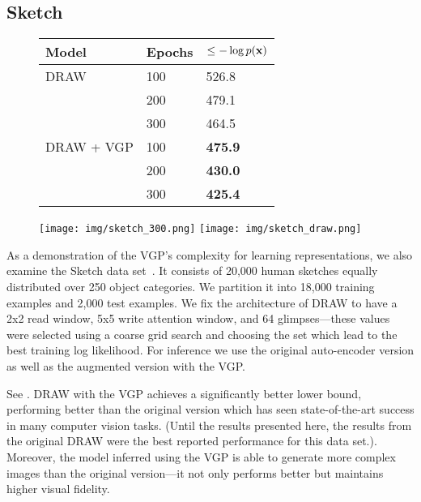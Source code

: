 \subsection{Sketch}
\begin{figure}[t]
\begin{minipage}{\textwidth}
\begin{minipage}[!t]{.45\textwidth}
\centering
\begin{tabular}{lll}
\toprule
Model & Epochs & $\le -\log p(\boldsymbol{\mathbf{x}})$
\\
\midrule
\gls{DRAW} & 100 & 526.8\\
           & 200 & 479.1\\
           & 300 & 464.5\\
\gls{DRAW} + \gls{VGP} & 100 & \textbf{475.9}\\
                       & 200 & \textbf{430.0}\\
                       & 300 & \textbf{425.4}\\
\bottomrule
\end{tabular}
\label{table:sketch}
\end{minipage}
\hfill
\begin{minipage}[!t]{.52\textwidth}
\centering
\texttt{[image: img/sketch\_300.png]}
\texttt{[image: img/sketch\_draw.png]}
\label{fig:sketch}
\end{minipage}
\end{minipage}
\end{figure}
As a demonstration of the \gls{VGP}'s complexity for learning
representations, we also examine
the Sketch data set~\citep{eitz2012hdhso}. It consists of 20,000 human
sketches equally distributed over 250 object categories. We partition
it into 18,000 training examples and 2,000 test examples. We fix
the architecture of \gls{DRAW} to
have a 2x2 read window, 5x5 write attention window, and
64 glimpses---these values were selected using a coarse grid search
and choosing the set which lead to the best training log likelihood.
For inference we use the original auto-encoder version as well as the
augmented version with the \gls{VGP}.

See . \gls{DRAW} with the \gls{VGP}
achieves a significantly better lower bound, performing better than
the original version which has seen state-of-the-art success in many computer
vision tasks. (Until the results presented here, the results from the
original \gls{DRAW}
were the best reported performance for this data set.). Moreover,
the model inferred using the \gls{VGP} is able to generate more
complex images than the original version---it not only performs better
but maintains higher visual fidelity.


